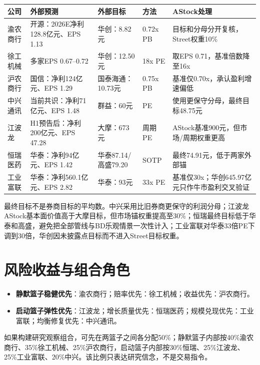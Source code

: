 \begin{exhibitbox}
\begin{tabularx}{\textwidth}{L{2.2cm}L{2.7cm}L{2.5cm}L{2.2cm}X}
\toprule
\textbf{公司} & \textbf{外部预测} & \textbf{外部目标} & \textbf{方法} & \textbf{AStock处理} \\
\midrule
渝农商行 & 开源：2026E净利128.8亿元、EPS 1.13 & 华创：8.82元 & 0.72x PB & 目标和分母分开复核，Street权重10\% \\
徐工机械 & 多家EPS 0.67--0.72 & 华创：12.50元 & 18x PE & 取EPS 0.71，基准倍数降至16x \\
沪农商行 & 国信：净利124亿元、EPS 1.29 & 国泰海通：10.73元 & 0.75x PB & 基准仅0.70x，承认盈利增速偏低 \\
中兴通讯 & 当前共识：净利71亿元、EPS 1.48 & 群益：60元 & PE & 使用更保守分母，最终目标48.75元 \\
江波龙 & H1预告后：净利200亿元、EPS 47.28 & 大摩：673元 & 周期PE & AStock基准900元，但市场/周期权重更高 \\
恒瑞医药 & 华泰：净利94亿元、EPS 1.42 & 华泰87.14/高盛79.20 & SOTP & 最终74.91元，低于两家外部锚 \\
工业富联 & 华泰：净利560.1亿元、EPS 2.82 & 华泰：93元 & 33x PE & 基准仅30x；华创645.97亿元只作牛市盈利交叉验证 \\
\bottomrule
\end{tabularx}
\end{exhibitbox}

最终目标不是券商目标的平均数。中兴采用比旧券商更保守的利润分母；江波龙AStock基本面价值高于大摩目标，但市场锚权重提高至30\%；恒瑞最终目标低于华泰和高盛，避免把全部管线与BD乐观情景一次性计入；工业富联对华泰33倍PE下调到30倍，华创因未披露点目标而不进入Street目标权重。

\section{风险收益与组合角色}

\begin{itemize}
  \item \textbf{静默篮子稳健优先}：渝农商行；赔率优先：徐工机械；收益优先：沪农商行。
  \item \textbf{启动篮子弹性优先}：江波龙；增长质量优先：恒瑞医药；规模兑现优先：工业富联；均衡修复优先：中兴通讯。
\end{itemize}

如果构建研究观察组合，可先在两篮子之间各分配50\%；静默篮子内部按40\%渝农商行、35\%徐工机械、25\%沪农商行，启动篮子内部按30\%恒瑞、25\%江波龙、25\%工业富联、20\%中兴。该比例只表达研究信念，不是交易指令。
